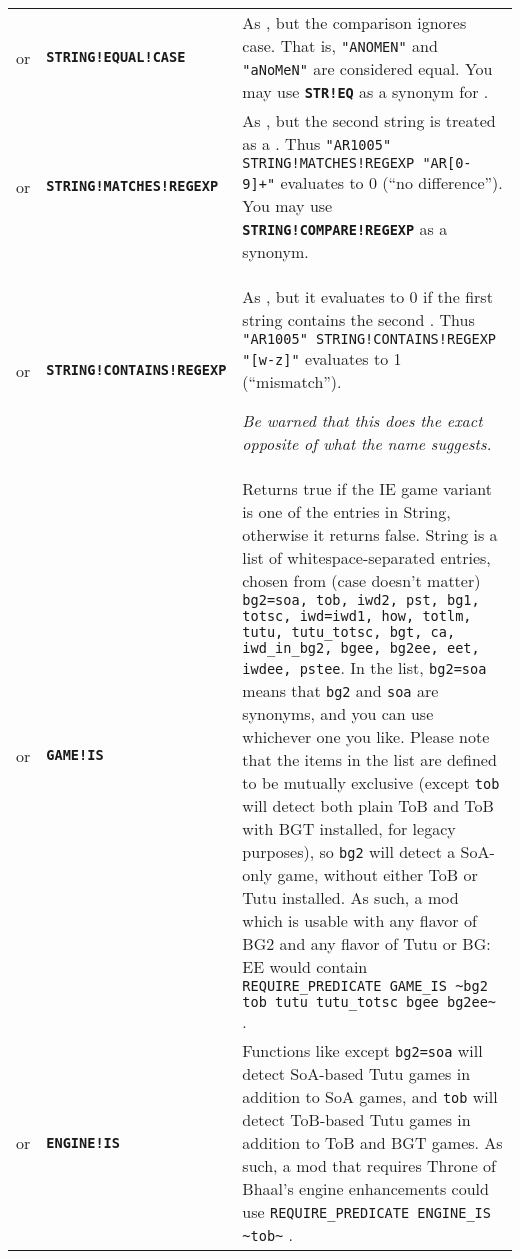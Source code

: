 \documentclass{article}
\def\ttref#1{\ahrefloc{#1}{\tt #1}}
\def\DEFINE#1{{\tt \bf #1}\label{#1}\index{#1}}
\def\t#1{{\tt #1}}
\begin{document}
\begin{tabular}{cp{10in}|p{10in}}
or & \ttref{String} \DEFINE{STRING!EQUAL!CASE} \ttref{String} &
As \ttref{STRING!EQUAL}, but the comparison ignores case. That is,
\t{"ANOMEN"} and \t{"aNoMeN"} are considered equal. You may use
\DEFINE{STR!EQ} as a synonym for \ttref{STRING!EQUAL!CASE}.\\

or & \ttref{String} \DEFINE{STRING!MATCHES!REGEXP} \ttref{String} &
As \ttref{STRING!COMPARE!CASE}, but the second string is treated as a
\ttref{regexp}. Thus \t{"AR1005" STRING!MATCHES!REGEXP "AR[0-9]+"}
evaluates to 0 (``no difference''). You may use
\DEFINE{STRING!COMPARE!REGEXP} as a synonym. \\

or & \ttref{String} \DEFINE{STRING!CONTAINS!REGEXP} \ttref{String} &
As \ttref{STRING!MATCHES!REGEXP}, but it evaluates to 0 if the first string
contains the second \ttref{regexp}. Thus \t{"AR1005" STRING!CONTAINS!REGEXP
"[w-z]"} evaluates to 1 (``mismatch'').

{\em Be warned that this does the exact opposite of what the name suggests.} \\

or & \DEFINE{GAME!IS} \ttref{String} & Returns true if the IE game variant
is one of the entries in String, otherwise it returns false. String is a list of
whitespace-separated entries, chosen from (case doesn't matter)
\verb+bg2=soa, tob, iwd2, pst, bg1, totsc, iwd=iwd1, how, totlm, tutu, tutu_totsc, bgt, ca, iwd_in_bg2, bgee, bg2ee, eet, iwdee, pstee+.
In the list, \verb+bg2=soa+ means that \verb+bg2+ and \verb+soa+ are synonyms,
and you can use whichever one you like. Please note that the items in the list are
defined to be mutually exclusive (except \verb+tob+ will detect both plain ToB
and ToB with BGT installed, for legacy purposes), so \verb+bg2+ will detect a
SoA-only game, without either ToB or Tutu installed. As such, a mod which is
usable with any flavor of BG2 and any flavor of Tutu or BG: EE would contain
\verb+REQUIRE_PREDICATE GAME_IS ~bg2 tob tutu tutu_totsc bgee bg2ee~+ . \\

or & \DEFINE{ENGINE!IS} \ttref{String} & Functions like \ttref{GAME!IS}
except \verb+bg2=soa+ will detect SoA-based Tutu games in addition to SoA games,
and \verb+tob+ will detect ToB-based Tutu games in addition to ToB and BGT games.
As such, a mod that requires Throne of Bhaal's engine enhancements could use
\verb+REQUIRE_PREDICATE ENGINE_IS ~tob~+ . \\


\end{tabular}
\end{document}
